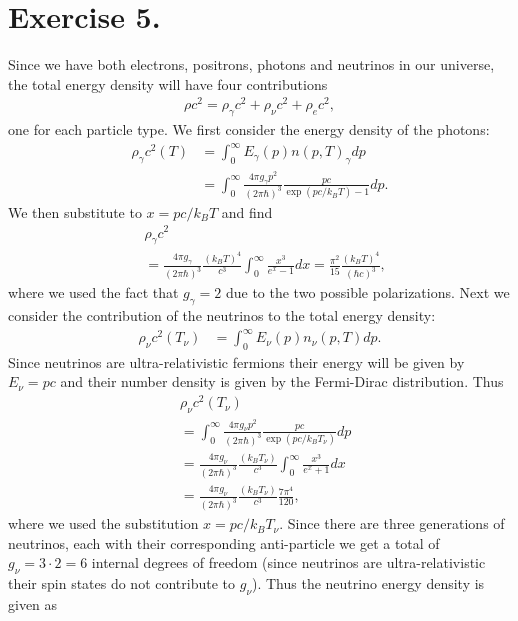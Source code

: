 \documentclass{emulateapj}
\begin{document}
	\section*{Exercise 5.}
	Since we have both electrons, positrons, photons and neutrinos in our universe, the total energy density will have four contributions
	\begin{align}
		\rho c^2 = \rho_\gamma c^2 + \rho_\nu c^2 + \rho_e c^2,
	\end{align}
	one for each particle type. We first consider the energy density of the photons:
	\begin{align}
		\rho_\gamma c^2(T) &= \int_{0}^{\infty}E_\gamma(p)n(p,T)_\gamma dp\\
		&=\int_{0}^{\infty}\frac{4\pi g_\gamma p^2}{(2\pi\hbar)^3}\frac{pc}{\exp(pc/k_BT) - 1}dp.
	\end{align}
	We then substitute to $x = pc/k_BT$ and find
	\begin{align}
		&\rho_\gamma c^2\\
		&=\frac{4\pi g_\gamma}{(2\pi\hbar)^3}\frac{(k_BT)^4}{c^3}\int_{0}^{\infty}\frac{x^3}{e^x - 1}dx = \frac{\pi^2}{15}\frac{(k_BT)^4}{(\hbar c)^3},
	\end{align}
	where we used the fact that $g_\gamma = 2$ due to the two possible polarizations. Next we consider the contribution of the neutrinos to the total energy density:
	\begin{align}
		\rho_\nu c^2(T_\nu) &= \int_{0}^{\infty}E_\nu(p) n_\nu(p,T)dp.
	\end{align}
	Since neutrinos are ultra-relativistic fermions their energy will be given by $E_\nu = pc$ and their number density is given by the Fermi-Dirac distribution. Thus 
	 \begin{align}
	 	&\rho_\nu c^2(T_\nu)\\
	 	&=\int_{0}^{\infty}\frac{4\pi g_\nu p^2}{(2\pi \hbar)^3}\frac{pc}{\exp(pc/k_BT_\nu)}dp \\
	 	&= \frac{4\pi g_\nu}{(2\pi\hbar)^3}\frac{(k_BT_\nu)}{c^3}\int_{0}^{\infty}\frac{x^3}{e^x + 1}dx \\
	 	&= \frac{4\pi g_\nu}{(2\pi\hbar)^3}\frac{(k_BT_\nu)}{c^3} \frac{7\pi^4}{120},
	 \end{align}
	 where we used the substitution $x = pc/k_BT_\nu$. Since there are three generations of neutrinos, each with their corresponding anti-particle we get a total of $g_\nu = 3\cdot2 = 6$ internal degrees of freedom (since neutrinos are ultra-relativistic their spin states do not contribute to $g_\nu$). Thus the neutrino energy density is given as
\end{document}

